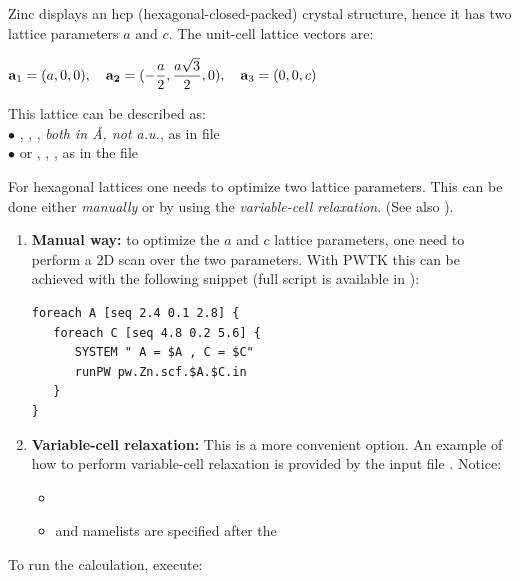 \documentclass[landscape]{foils}
\begin{document}
%
Zinc displays an hcp (hexagonal-closed-packed) crystal structure, hence
it has two lattice parameters $a$ and $c$. The unit-cell lattice
vectors are:\\
%
\centerline{$\displaystyle
  {\bf a}_1=(a,0,0), \quad {\bf a_2}=(-{a\over 2},{a\sqrt{3}\over 2},0),
  \quad {\bf a}_3=(0,0,c)$}
%
This lattice can be described as:\\
$\bullet$ , , , {\em both in \AA,
  not a.u.}, as in file \\
$\bullet$ or , , ,
as in the file 

For hexagonal lattices one needs to optimize two lattice
parameters. This can be done either {\em manually} or by using the
{\em variable-cell relaxation}. (See also ).
\vspace{-1em}
\begin{enumerate}
\item {\bf Manual way:} to optimize the $a$ and $c$ lattice
  parameters, one need to perform a 2D scan over the two
  parameters. With PWTK this can be achieved with the following
  snippet (full script is available in
  ):
  \vspace{-0.5em}
  {\codecolor
\begin{verbatim}
foreach A [seq 2.4 0.1 2.8] {
   foreach C [seq 4.8 0.2 5.6] {
      SYSTEM " A = $A , C = $C"        
      runPW pw.Zn.scf.$A.$C.in
   }
}
\end{verbatim}
  }
\item {\bf Variable-cell relaxation:} This is a more convenient
  option. An example of how to perform variable-cell relaxation is
  provided by the input file . Notice:
  \begin{itemize}
  \item {}
  \item {} and  namelists are specified after
    the 
  \end{itemize}
\end{enumerate}
To run the calculation, execute:\\[0.5em]
\end{document}
